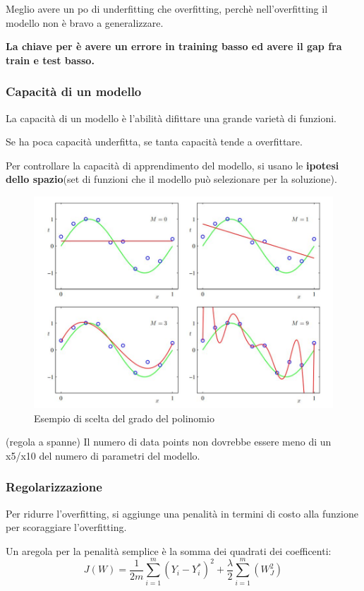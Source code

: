 Meglio avere un po di underfitting che overfitting, perchè nell'overfitting il modello
non è bravo a generalizzare.

\textbf{
    La chiave per è avere un errore in training basso ed
    avere il gap fra train e test basso.
}


\subsubsection{Capacità di un modello}

La capacità di un modello è l'abilità difittare una grande varietà
di funzioni.

Se ha poca capacità underfitta, se tanta capacità tende a overfittare.

Per controllare la capacità di apprendimento del modello, si usano
le \textbf{ipotesi dello spazio}(set di funzioni che il
modello può selezionare per la soluzione).


\begin{figure}[H]
    \centering
    \includegraphics[width=0.6\linewidth]{imgs/ordine-polinomiale-under-over-fitting}
    \caption{Esempio di scelta del grado del polinomio}
    \label{fig:scelta_M}
\end{figure}

(regola a spanne)
Il numero di data points non dovrebbe essere meno di un x5/x10 del numero
di parametri del modello.

\subsubsection{Regolarizzazione}
Per ridurre l'overfitting, si aggiunge una penalità in termini di costo
alla funzione per scoraggiare l'overfitting.

Un aregola per la penalità semplice è la somma dei quadrati dei coefficenti:
\begin{equation}
    J(W) = \frac{1}{2m}\sum_{i=1}^{m}(Y_i-Y_i^*)^2 +
    \frac{\lambda}{2}\sum_{i=1}^{m}(W_J^2)
\end{equation}

